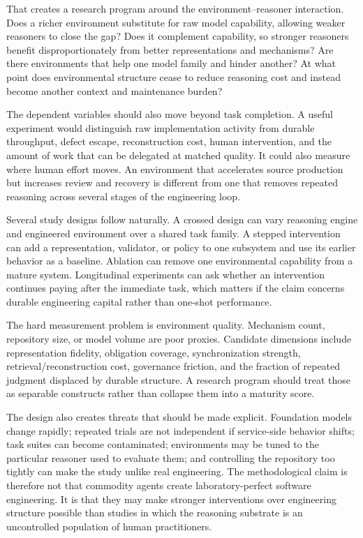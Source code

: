 That creates a research program around the environment--reasoner interaction. Does a richer environment substitute for raw model capability, allowing weaker reasoners to close the gap? Does it complement capability, so stronger reasoners benefit disproportionately from better representations and mechanisms? Are there environments that help one model family and hinder another? At what point does environmental structure cease to reduce reasoning cost and instead become another context and maintenance burden?

The dependent variables should also move beyond task completion. A useful experiment would distinguish raw implementation activity from durable throughput, defect escape, reconstruction cost, human intervention, and the amount of work that can be delegated at matched quality. It could also measure where human effort moves. An environment that accelerates source production but increases review and recovery is different from one that removes repeated reasoning across several stages of the engineering loop.

Several study designs follow naturally. A crossed design can vary reasoning engine and engineered environment over a shared task family. A stepped intervention can add a representation, validator, or policy to one subsystem and use its earlier behavior as a baseline. Ablation can remove one environmental capability from a mature system. Longitudinal experiments can ask whether an intervention continues paying after the immediate task, which matters if the claim concerns durable engineering capital rather than one-shot performance.

The hard measurement problem is environment quality. Mechanism count, repository size, or model volume are poor proxies. Candidate dimensions include representation fidelity, obligation coverage, synchronization strength, retrieval/reconstruction cost, governance friction, and the fraction of repeated judgment displaced by durable structure. A research program should treat those as separable constructs rather than collapse them into a maturity score.

The design also creates threats that should be made explicit. Foundation models change rapidly; repeated trials are not independent if service-side behavior shifts; task suites can become contaminated; environments may be tuned to the particular reasoner used to evaluate them; and controlling the repository too tightly can make the study unlike real engineering. The methodological claim is therefore not that commodity agents create laboratory-perfect software engineering. It is that they may make stronger interventions over engineering structure possible than studies in which the reasoning substrate is an uncontrolled population of human practitioners.

